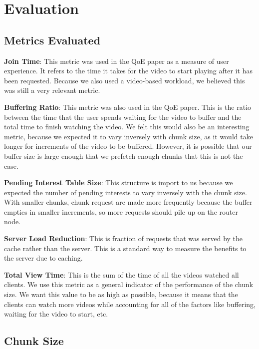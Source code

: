 \section{Evaluation} \label{sec:eval}

\subsection{Metrics Evaluated} \label{sec:metrics}

\textbf{Join Time}: This metric was used in the QoE paper as a measure of user
experience. It refers to the time it takes for the video to start playing after
it has been requested. Because we also used a video-based workload, we believed
this was still a very relevant metric.

\textbf{Buffering Ratio}: This metric was also used in the QoE paper. This is the ratio
between the  time that the user spends waiting for the video to buffer and the
total time to finish watching the video. We felt this would also be an
interesting metric, because we expected it to vary inversely with chunk size, as
it would take longer for increments of the video to be buffered. However, it is
possible that our buffer size is large enough that we prefetch enough chunks
that this is not the case.

\textbf{Pending Interest Table Size}: This structure is import to us because we expected
the number of pending interests to vary inversely with the chunk size. With
smaller chunks, chunk request are made more frequently because the buffer
empties in smaller increments, so more requests should pile up on the router
node.

\textbf{Server Load Reduction}: This is fraction of requests that was served by the cache
rather than the server. This is a standard way to measure the benefits to the
server due to caching.

\textbf{Total View Time}: This is the sum of the time of all the videos watched
all clients. We use this metric as a general indicator of the performance of the
chunk size. We want this value to be as high as possible, because it means that
the clients can watch more videos while accounting for all of the factors like
buffering, waiting for the video to start, etc.

\subsection{Chunk Size} \label{sec:chunksize}


